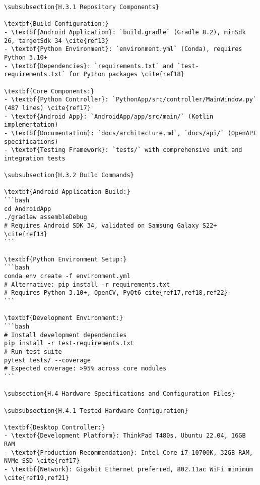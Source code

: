 \begin{verbatim}
\subsubsection{H.3.1 Repository Components}

\textbf{Build Configuration:}
- \textbf{Android Application}: `build.gradle` (Gradle 8.2), minSdk 26, targetSdk 34 \cite{ref13}
- \textbf{Python Environment}: `environment.yml` (Conda), requires Python 3.10+
- \textbf{Dependencies}: `requirements.txt` and `test-requirements.txt` for Python packages \cite{ref18}

\textbf{Core Components:}
- \textbf{Python Controller}: `PythonApp/src/controller/MainWindow.py` (487 lines) \cite{ref17}
- \textbf{Android App}: `AndroidApp/app/src/main/` (Kotlin implementation)
- \textbf{Documentation}: `docs/architecture.md`, `docs/api/` (OpenAPI specifications)
- \textbf{Testing Framework}: `tests/` with comprehensive unit and integration tests

\subsubsection{H.3.2 Build Commands}

\textbf{Android Application Build:}
```bash
cd AndroidApp
./gradlew assembleDebug
# Requires Android SDK 34, validated on Samsung Galaxy S22+ \cite{ref13}
```

\textbf{Python Environment Setup:}
```bash
conda env create -f environment.yml
# Alternative: pip install -r requirements.txt
# Requires Python 3.10+, OpenCV, PyQt6 cite{ref17,ref18,ref22}
```

\textbf{Development Environment:}
```bash
# Install development dependencies
pip install -r test-requirements.txt
# Run test suite
pytest tests/ --coverage
# Expected coverage: >95% across core modules
```

\subsection{H.4 Hardware Specifications and Configuration Files}

\subsubsection{H.4.1 Tested Hardware Configuration}

\textbf{Desktop Controller:}
- \textbf{Development Platform}: ThinkPad T480s, Ubuntu 22.04, 16GB RAM
- \textbf{Production Recommendation}: Intel Core i7-10700K, 32GB RAM, NVMe SSD \cite{ref17}
- \textbf{Network}: Gigabit Ethernet preferred, 802.11ac WiFi minimum \cite{ref19,ref21}


\end{verbatim}
